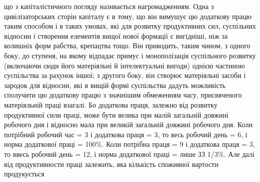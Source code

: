 що з капіталістичного погляду називається нагромадженням. Одна з цивілізаторських
сторін капіталу є в тому, що він вимушує цю додаткову працю
таким способом і в таких умовах, які для розвитку продуктивних сил, суспільних
відносин і створення елементів вищої нової формації є вигідніші, ніж за колишніх
форм рабства, крепацтва тощо. Він приводить, таким чином, з одного боку, до
ступеня, на якому відпадає примус і монополізація суспільного розвитку (включаючи
сюди його матеріяльні й інтелектуальні вигоди) однією частиною суспільства
за рахунок іншої; з другого боку, він створює матеріяльні засоби
і зародок для відносин, які в вищій формі суспільства дадуть можливість сполучити
цю додаткову працю з значнішим обмеженням часу, присвяченого матеріяльній
праці взагалі. Бо додаткова праця, залежно від розвитку продуктивної
сили праці, може бути велика при малій загальній довжині робочого дня і відносно
мала при великій загальній довжині робочого дня. Коли потрібний робочий
час = 3 і додаткова праця = 3, то весь робочий день = 6, і норма додаткової
праці = 100\%. Коли потрібна праця = 9 і додаткова праця = 3, то ввесь
робочий день = 12, і норма додаткової праці = лише ЗЗ 1/3\%. Але далі від продуктивности
праці залежить, яка кількість споживної вартости продукується